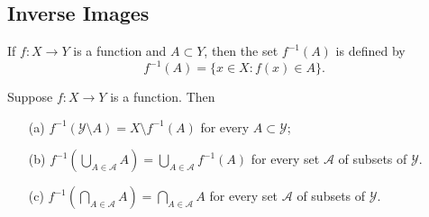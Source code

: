 \documentclass[11pt,a4paper]{book}
\begin{document}
\subsection{Inverse Images}

\begin{definition}
    If \( f: X  \to Y  \) is a function and \( A \subset Y  \), then the set \( f^{-1}(A) \) is defined by
    \[  f^{-1}(A) = \{ x \in X : f(x) \in A  \}. \]
\end{definition}

\begin{prop}
   Suppose \( f: X \to Y  \) is a function. Then 
   \begin{enumerate}
       \item[(a)] \( f^{-1} (\mathcal{Y} \setminus  A ) = X \setminus  f^{-1}(A)  \) for every \( A \subset \mathcal{Y} \);
        \item[(b)] \( f^{-1}(\bigcup_{ A \in \mathcal{A} }^{  }  A ) = \bigcup_{ A \in \mathcal{A} }^{  } f^{-1}(A) \) for every set \( \mathcal{A} \) of subsets of \( \mathcal{Y} \).
        \item[(c)] \( f^{-1}(\bigcap_{  A \in \mathcal{A} }^{  } A ) = \bigcap_{  A \in \mathcal{A} }^{  } A  \) for every set \( \mathcal{A}  \) of subsets of \( \mathcal{Y} \).
   \end{enumerate}
\end{prop}
\end{document}
